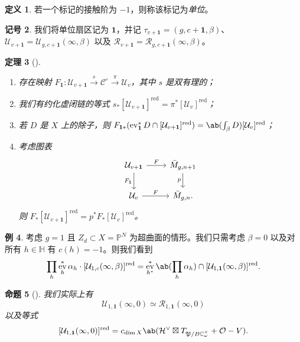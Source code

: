 \documentclass{amsart}
\newtheorem{thm}{定理}[section]
\newtheorem{prop}[thm]{命题}
\theoremstyle{definition}
\newtheorem{defn}[thm]{定义}
\newtheorem{exm}[thm]{例}
\newtheorem{notn}[thm]{记号}
\theoremstyle{remark}
\theoremstyle{plain}
\theoremstyle{definition}
\theoremstyle{remark}
\newcommand{\C}{\mathbb{C}}
\renewcommand{\H}{\mathbb{H}}
\renewcommand{\P}{\mathbb{P}}
\newcommand{\mc}[1]{\mathcal{#1}}
\newcommand{\mf}[1]{\mathfrak{#1}}
\newcommand{\mr}[1]{\mathrm{#1}}
\newcommand{\on}[1]{\operatorname{#1}}
\newcommand{\1}{\mathbf{1}}
\newcommand{\2}{\mathbf{2}}
\newcommand{\3}{\mathbf{3}}
\DeclareMathOperator{\ev}{ev}
\begin{document}
\begin{defn}
    若一个标记的接触阶为 \(-1\)，则称该标记为\textit{单位}。
\end{defn}

\begin{notn}
    我们将单位扇区记为 \(\1\)，并记 \(\tau_{v+\1} = (g, c+\1, \beta)\)、\(\mc{U}_{v+\1} = \mc{U}_{g, c+\1}(\infty, \beta)\) 以及 \(\mc{R}_{v+\1} = \mc{R}_{g, c+\1}(\infty, \beta)\)。
\end{notn}

\begin{thm}[{\cite[Theorems~1.16--1.17]{CJRpunctured}}]\leavevmode
    \begin{enumerate}
        \item 存在映射 \(F_{\1} \colon \mc{U}_{v+\1} \xrightarrow{s} \mc{C}^{\circ} \xrightarrow{\pi} \mc{U}_v\)，其中 \(s\) 是双有理的；
        \item 我们有约化虚闭链的等式 \(s_* [\mc{U}_{v+\1}]^{\on{red}} = \pi^* [\mc{U}_v]^{\on{red}}\)；
        \item 若 \(D\) 是 \(X\) 上的除子，则 \(F_{\1 *} (\ev_{\1}^* D \cap [\mc{U}_{v+\1}]^{\on{red}}) = \ab(\int_{\beta} D) [\mc{U}_v]^{\on{red}}\)；
        \item 考虑图表
            \begin{equation*}
            \begin{tikzcd}
                \mc{U}_{v+\1} \ar{r}{F} \ar{d}[swap]{F_{\1}} & \bar{M}_{g,n+1} \ar{d}[swap]{p} \\
                \mc{U}_v \ar{r}{F} & \bar{M}_{g,n}.
            \end{tikzcd}
            \end{equation*}
            则 \(F_* [\mc{U}_{v+\1}]^{\on{red}} = p^* F_* [\mc{U}_v]^{\on{red}}\)。
    \end{enumerate}
\end{thm}

\begin{exm}
    考虑 \(g = 1\) 且 \(Z_d \subset X = \P^N\) 为超曲面的情形。我们只需考虑 \(\beta = 0\) 以及对所有 \(h \in \H\) 有 \(c(h) = -1\)。则我们看到
    \[ \prod_h \ev_h^* \alpha_h \cdot [\mc{U}_{1,c}(\infty,\beta)]^{\mr{red}} = \ev_{h^{\star}}^* \ab(\prod_h \alpha_h) \cap [\mc{U}_{1,\1}(\infty,\beta)]^{\on{red}}. \]
\end{exm}

\begin{prop}[{\cite{CJRpunctured}}]
    我们实际上有
    \[ \mc{U}_{1,\1}(\infty, 0) \simeq \mc{R}_{1,\1}(\infty, 0) \]
    以及等式
    \[ [\mc{U}_{1,\1}(\infty, 0)]^{\on{red}} = c_{\dim X} \ab(\mc{H}^{\vee} \boxtimes T_{\mf{P}/B\C_{\omega}^{\times}} + \mc{O} - V). \]
\end{prop}
\end{document}
